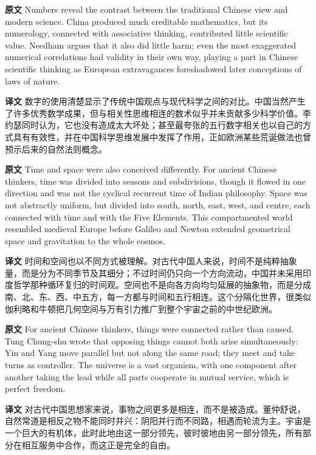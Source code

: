 \documentclass[UTF8,zihao=-4]{ctexart}
\newcommand{\BodyFont}{\fontsize{10.5pt}{15.5pt}\selectfont}
\newcommand{\origlabel}{\textbf{原文}\quad}
\newcommand{\translabel}{\textbf{译文}\quad}
\newenvironment{enblock}{\par\noindent\begingroup\BodyFont\origlabel}{\par\endgroup}
\newenvironment{zhblock}{\par\noindent\begingroup\BodyFont\translabel}{\par\endgroup\vspace{0.35em}}
\begin{document}
\begin{enblock}
Numbers reveal the contrast between the traditional Chinese view and modern science. China produced much creditable mathematics, but its numerology, connected with associative thinking, contributed little scientific value. Needham argues that it also did little harm; even the most exaggerated numerical correlations had validity in their own way, playing a part in Chinese scientific thinking as European extravagances foreshadowed later conceptions of laws of nature.
\end{enblock}
\begin{zhblock}
数字的使用清楚显示了传统中国观点与现代科学之间的对比。中国当然产生了许多优秀数学成果，但与相关性思维相连的数术似乎并未贡献多少科学价值。李约瑟同时认为，它也没有造成太大坏处；甚至最夸张的五行数字相关也以自己的方式具有有效性，并在中国科学思维发展中发挥了作用，正如欧洲某些荒诞做法也曾预示后来的自然法则概念。
\end{zhblock}

\begin{enblock}
Time and space were also conceived differently. For ancient Chinese thinkers, time was divided into seasons and subdivisions, though it flowed in one direction and was not the cyclical recurrent time of Indian philosophy. Space was not abstractly uniform, but divided into south, north, east, west, and centre, each connected with time and with the Five Elements. This compartmented world resembled medieval Europe before Galileo and Newton extended geometrical space and gravitation to the whole cosmos.
\end{enblock}
\begin{zhblock}
时间和空间也以不同方式被理解。对古代中国人来说，时间不是纯粹抽象量，而是分为不同季节及其细分；不过时间仍只向一个方向流动，中国并未采用印度哲学那种循环复归的时间观。空间也不是向各方向均匀延展的抽象物，而是分成南、北、东、西、中五方，每一方都与时间和五行相连。这个分隔化世界，很类似伽利略和牛顿把几何空间与万有引力推广到整个宇宙之前的中世纪欧洲。
\end{zhblock}

\begin{enblock}
For ancient Chinese thinkers, things were connected rather than caused. Tung Chung-shu wrote that opposing things cannot both arise simultaneously: Yin and Yang move parallel but not along the same road; they meet and take turns as controller. The universe is a vast organism, with one component after another taking the lead while all parts cooperate in mutual service, which is perfect freedom.
\end{enblock}
\begin{zhblock}
对古代中国思想家来说，事物之间更多是相连，而不是被造成。董仲舒说，自然常道是相反之物不能同时并兴：阴阳并行而不同路，相遇而轮流为主。宇宙是一个巨大的有机体，此时此地由这一部分领先，彼时彼地由另一部分领先，所有部分在相互服务中合作，而这正是完全的自由。
\end{zhblock}
\end{document}
